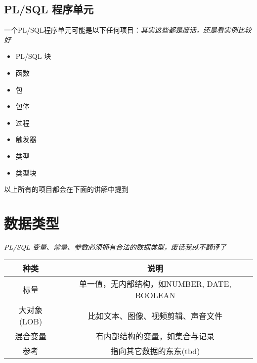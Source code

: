 \documentclass{article}
\begin{document}
\subsection{PL/SQL 程序单元}
一个PL/SQL程序单元可能是以下任何项目：\textit{其实这些都是废话，还是看实例比较好}

\begin{itemize}
\item PL/SQL 块
\item 函数
\item 包
\item 包体
\item 过程
\item 触发器
\item 类型
\item 类型块
\end{itemize}

以上所有的项目都会在下面的讲解中提到

\section{数据类型}
\textit{PL/SQL 变量、常量、参数必须拥有合法的数据类型，废话我就不翻译了
}

\begin{tabular}{c|c}
\hline
种类 & 说明 \\
\hline
标量 & 单一值，无内部结构，如NUMBER, DATE, BOOLEAN \\
\hline
大对象(LOB) & 比如文本、图像、视频剪辑、声音文件 \\
\hline
混合变量 & 有内部结构的变量，如集合与记录 \\
\hline
参考 & 指向其它数据的东东(tbd) \\
\hline
\end{tabular}
\end{document}
